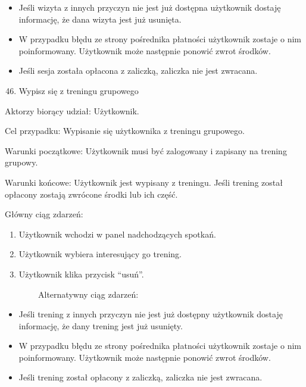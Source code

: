 \documentclass[
]{article}
\providecommand{\tightlist}{%
  \setlength{\itemsep}{0pt}\setlength{\parskip}{0pt}}
\begin{document}
\begin{itemize}
\tightlist
\item
  {Jeśli wizyta z innych przyczyn nie jest już dostępna użytkownik
  dostaję informację, że dana wizyta jest już usunięta.}
\item
  {W przypadku błędu ze strony pośrednika płatności użytkownik zostaje o
  nim poinformowany. Użytkownik może następnie ponowić zwrot środków.}
\item
  {Jeśli sesja została opłacona z zaliczką, zaliczka nie jest zwracana.}
\end{itemize}

{}

\begin{enumerate}
\setcounter{enumi}{45}
\tightlist
\item
  {Wypisz się z treningu grupowego}
\end{enumerate}

{Aktorzy biorący udział: Użytkownik.}

{Cel przypadku: Wypisanie się użytkownika z treningu grupowego.}

{Warunki początkowe: Użytkownik musi być zalogowany i zapisany na
trening grupowy. }

{Warunki końcowe: Użytkownik jest wypisany z treningu. Jeśli trening
został opłacony zostają zwrócone środki lub ich część.}

{Główny ciąg zdarzeń: }

\begin{enumerate}
\tightlist
\item
  {Użytkownik wchodzi w panel nadchodzących spotkań.}
\item
  {Użytkownik wybiera interesujący go trening.}
\item
  {Użytkownik klika przycisk ``usuń''.}
\end{enumerate}

{~~~~~~~~Alternatywny ciąg zdarzeń:}

\begin{itemize}
\tightlist
\item
  {Jeśli trening z innych przyczyn nie jest już dostępny użytkownik
  dostaję informację, że dany trening jest już usunięty.}
\item
  {W przypadku błędu ze strony pośrednika płatności użytkownik zostaje o
  nim poinformowany. Użytkownik może następnie ponowić zwrot środków.}
\item
  {Jeśli trening został opłacony z zaliczką, zaliczka nie jest
  zwracana.}
\end{itemize}
\end{document}
